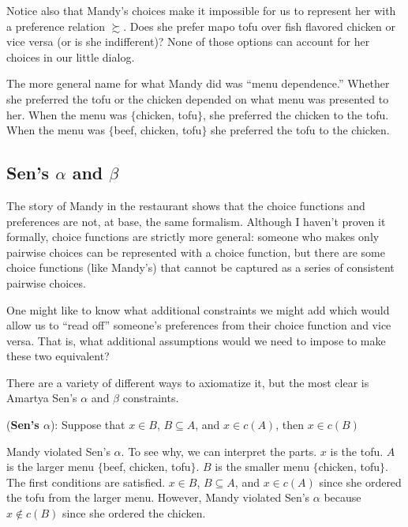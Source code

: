 Notice also that Mandy's choices make it impossible for us to represent her with a preference relation $\succsim$.  Does she prefer mapo tofu over fish flavored chicken or vice versa (or is she indifferent)?  None of those options can account for her choices in our little dialog.

The more general name for what Mandy did was ``menu dependence.''  Whether she preferred the tofu or the chicken depended on what menu was presented to her.  When the menu was $\{$chicken, tofu$\}$, she preferred the chicken to the tofu. When the menu was $\{$beef, chicken, tofu$\}$ she preferred the tofu to the chicken.

\subsection{Sen's $\alpha$ and $\beta$}

The story of Mandy in the restaurant shows that the choice functions and preferences are not, at base, the same formalism.  Although I haven't proven it formally, choice functions are strictly more general: someone who makes only pairwise choices can be represented with a choice function, but there are some choice functions (like Mandy's) that cannot be captured as a series of consistent pairwise choices.


One might like to know what additional constraints we might add which would allow us to ``read off'' someone's preferences from their choice function and vice versa.  That is, what additional assumptions would we need to impose to make these two equivalent?

There are a variety of different ways to axiomatize it, but the most clear is Amartya Sen's $\alpha$ and $\beta$ constraints.

\begin{definition}
({\bf Sen's $\alpha$}): Suppose that $x \in B$, $B \subseteq A$, and $x \in c(A)$, then $x \in c(B)$
\end{definition}

Mandy violated Sen's $\alpha$.  To see why, we can interpret the parts.  $x$ is the tofu.  $A$ is the larger menu $\{$beef, chicken, tofu$\}$.  $B$ is the smaller menu $\{$chicken, tofu$\}$.  The first conditions are satisfied.  $x \in B$, $B \subseteq A$, and $x \in c(A)$ since she ordered the tofu from the larger menu.  However, Mandy violated Sen's $\alpha$ because $x \notin c(B)$ since she ordered the chicken.

